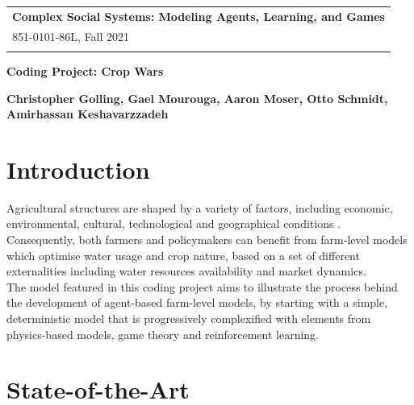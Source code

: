 \documentclass[a4paper,12pt]{article} %
\begin{document}
\thispagestyle{empty}
\begin{tabular}{p{15.5cm}}
{\bf Complex Social Systems: Modeling Agents, Learning, and Games} \\
851-0101-86L, Fall 2021  \\
\hline \\
\end{tabular}
\vspace*{0.3cm}
\begin{center}
	{\Large \bf Coding Project: Crop Wars}
	\vspace{2mm}
        
	{\bf Christopher Golling, Gael Mourouga, Aaron Moser, Otto Schmidt, Amirhassan Keshavarzzadeh }
		
\end{center}  

\vspace{0.4cm}

\section{Introduction}

Agricultural structures are shaped by a variety of factors, including economic, environmental, cultural, technological and geographical conditions \cite{happeAgriculturalPoliciesFarm2004}. \\
Consequently, both farmers and policymakers can benefit from farm-level models which optimise water usage and crop nature, based on a set of different externalities including water resources availability and market dynamics.\\
The model featured in this coding project aims to illustrate the process behind the development of agent-based farm-level models, by starting with a simple, deterministic model that is progressively complexified with elements from physics-based models, game theory and reinforcement learning.


\section{State-of-the-Art}
\end{document}
